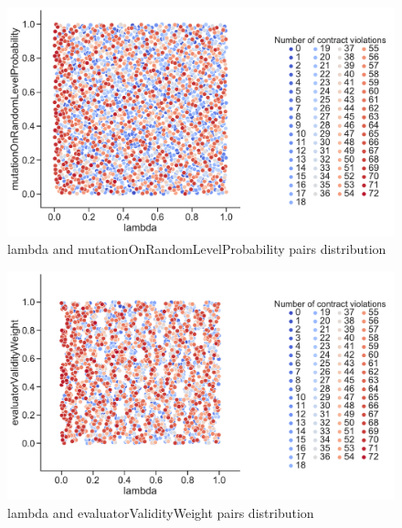 \begin{figure}
	\centering
	\includegraphics[width=\textwidth]{images/PairsDistr/lambda_mutationOnRandomLevelProbability.pdf}
	\caption[lambda and mutationOnRandomLevelProbability pairs distribution]{lambda and mutationOnRandomLevelProbability pairs distribution}
	\label{fig:lambda_mutationOnRandomLevelProbability_pair}
\end{figure}
\begin{figure}
	\centering
	\includegraphics[width=\textwidth]{images/PairsDistr/lambda_evaluatorValidityWeight.pdf}
	\caption[lambda and evaluatorValidityWeight pairs distribution]{lambda and evaluatorValidityWeight pairs distribution}
	\label{fig:lambda_evaluatorValidityWeight_pair}
\end{figure}
